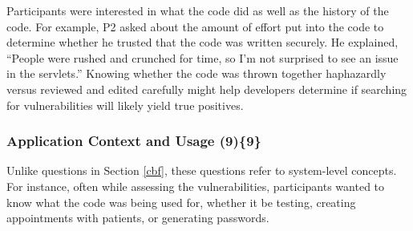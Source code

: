 \documentclass{sig-alternate}
\begin{document}
Participants were interested in what the code did as well as the history of the code.
For example, P2 asked about the amount of effort put into the code to determine whether he trusted that the code was written securely.
He explained, ``People were rushed and crunched for time, so I'm not surprised to see an issue in the servlets.'' 
Knowing whether the code was thrown together haphazardly versus reviewed and edited carefully might help developers determine if searching for vulnerabilities will likely yield true positives.





% 


\subsubsection{\textbf{Application Context and Usage (9)\{9\}}}\label{acu}

Unlike questions in Section \ref{cbf}, these questions refer to system-level concepts.
For instance, often while assessing the vulnerabilities, participants wanted to know what the code was being used for, whether it be testing, creating appointments with patients, or generating passwords.
\\
\end{document}
